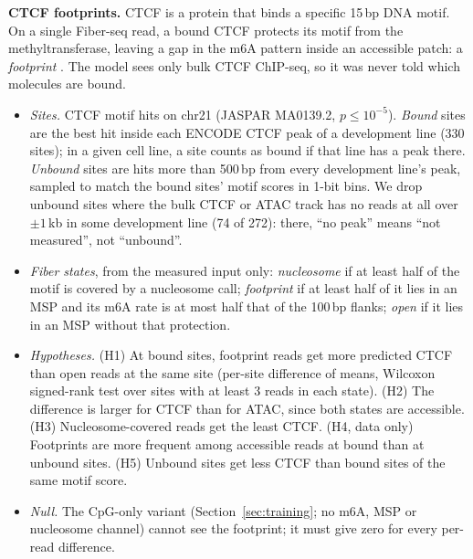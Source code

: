 \documentclass[acmtog,nonacm]{acmart}   %
\begin{document}
\textbf{CTCF footprints.} CTCF is a protein that binds a specific 15\,bp DNA motif. On a single Fiber-seq read, a
bound CTCF protects its motif from the methyltransferase, leaving a gap in the m6A pattern inside an accessible
patch: a \emph{footprint} \citep{Stergachis20}. The model sees only bulk CTCF ChIP-seq, so it was never told which
molecules are bound.
\begin{itemize}
  \item \emph{Sites.} CTCF motif hits on chr21 (JASPAR MA0139.2, $p\le10^{-5}$). \emph{Bound} sites are the best hit
    inside each ENCODE CTCF peak of a development line (330 sites); in a given cell line, a site counts as bound if
    that line has a peak there. \emph{Unbound} sites are hits more than 500\,bp from every development line's peak,
    sampled to match the bound sites' motif scores in 1-bit bins. We drop unbound sites where the bulk CTCF or ATAC
    track has no reads at all over $\pm1$\,kb in some development line (74 of 272): there, ``no peak'' means
    ``not measured'', not ``unbound''.
  \item \emph{Fiber states}, from the measured input only: \emph{nucleosome} if at least half of the motif is
    covered by a nucleosome call; \emph{footprint} if at least half of it lies in an MSP and its m6A rate is at most
    half that of the 100\,bp flanks; \emph{open} if it lies in an MSP without that protection.
  \item \emph{Hypotheses.} (H1) At bound sites, footprint reads get more predicted CTCF than open reads at the same
    site (per-site difference of means, Wilcoxon signed-rank test over sites with at least 3 reads in each state).
    (H2) The difference is larger for CTCF than for ATAC, since both states are accessible. (H3) Nucleosome-covered
    reads get the least CTCF. (H4, data only) Footprints are more frequent among accessible reads at bound than at
    unbound sites. (H5) Unbound sites get less CTCF than bound sites of the same motif score.
  \item \emph{Null.} The CpG-only variant (Section~\ref{sec:training}; no m6A, MSP or nucleosome channel) cannot see the
    footprint; it must give zero for every per-read difference.
\end{itemize}
\end{document}
